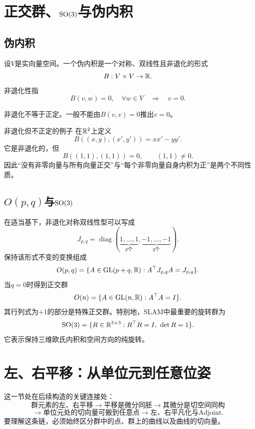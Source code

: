 
\section{正交群、$\operatorname{SO}(3)$与伪内积}

\subsection{伪内积}

\begin{definition}[伪内积]
设$V$是实向量空间。一个伪内积是一个对称、双线性且非退化的形式
\[
    B:V\times V\to\mathbb{R}.
\]
非退化性指
\[
    B(v,w)=0,\quad\forall w\in V
    \quad\Longrightarrow\quad v=0.
\]
\end{definition}

非退化不等于正定。一般不能由$B(v,v)=0$推出$v=0$。

\begin{lieexample}{非退化但不正定的例子}
在$\mathbb{R}^2$上定义
\[
    B((x,y),(x',y'))=xx'-yy'.
\]
它是非退化的，但
\[
    B((1,1),(1,1))=0,
    \qquad (1,1)\neq0.
\]
因此“没有非零向量与所有向量正交”与“每个非零向量自身内积为正”是两个不同性质。
\end{lieexample}

\subsection{$O(p,q)$与$\operatorname{SO}(3)$}

在适当基下，非退化对称双线性型可以写成
\[
    J_{p,q}
    =\operatorname{diag}(\underbrace{1,\ldots,1}_{p\text{个}},
    \underbrace{-1,\ldots,-1}_{q\text{个}}).
\]
保持该形式不变的变换组成
\[
    O(p,q)
    =\{A\in\mathrm{GL}(p+q,\mathbb{R}):A^\top J_{p,q}A=J_{p,q}\}.
\]
当$q=0$时得到正交群
\[
    O(n)=\{A\in\mathrm{GL}(n,\mathbb{R}):A^\top A=I\}.
\]
其行列式为$+1$的部分是特殊正交群。特别地，SLAM中最重要的旋转群为
\[
    \SO(3)=\{R\in\R^{3\times3}:R^\top R=I,\ \det R=1\}.
\]
它表示保持三维欧氏内积和空间方向的纯旋转。


\section{左、右平移：从单位元到任意位姿}

这一节处在后续构造的关键连接处：
\[
    \text{群元素的左、右平移}
    \longrightarrow
    \text{平移是微分同胚}
    \longrightarrow
    \text{其微分是切空间同构}
\]
\[
    \longrightarrow
    \text{单位元处的切向量可搬到任意点}
    \longrightarrow
    \text{左、右平凡化与Adjoint}.
\]
要理解这条链，必须始终区分群中的点、群上的曲线以及曲线的切向量。


